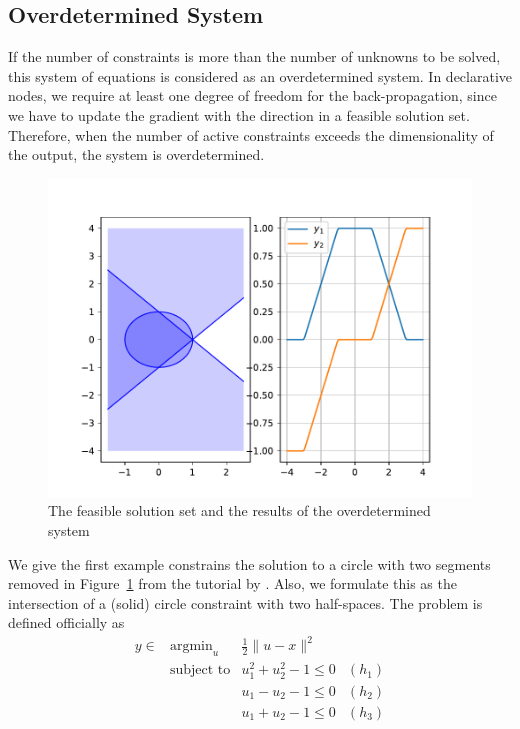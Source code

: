 \subsection{Overdetermined System}
If the number of constraints is more than the number of unknowns to be solved, this system of equations is considered as an overdetermined system. In declarative nodes, we require at least one degree of freedom for the back-propagation, since we have to update the gradient with the direction in a feasible solution set. Therefore, when the number of active constraints exceeds the dimensionality of the output, the system is overdetermined. 
\begin{figure}[t]
    \label{fig:overdetermined-solution}
    \centering
    \includegraphics[page=1, width=.8\textwidth]{figs/overdetermined.pdf}
    \caption{The feasible solution set and the results of the overdetermined system~\citep{SG:19}}
\end{figure}
\par We give the first example constrains the solution to a circle with two segments removed in Figure~\ref{fig:overdetermined-solution} from the tutorial by \cite{SG:19}. Also, we formulate this as the intersection of a (solid) circle constraint with two half-spaces. The problem is defined officially as 
\begin{equation}
    \begin{array}{llll}
        y \in & \text{argmin}_u & \frac{1}{2} \|u - x\|^2 \\
        & \text{subject to} & u_1^2 + u_2^2 - 1 \leq 0 & (h_1) \\
        & & u_1 - u_2 - 1 \leq 0 & (h_2) \\
        & & u_1 + u_2 - 1 \leq 0 & (h_3)
    \end{array}
\end{equation}
